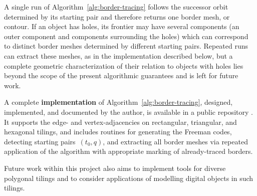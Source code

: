 \begin{remark}
    A single run of Algorithm~\ref{alg:border-tracing} follows the successor orbit determined by its starting pair and therefore returns one border mesh, or contour.
    If an object has holes, its frontier may have several components (an outer component and components surrounding the holes) which can correspond to distinct border meshes determined by different starting pairs.
    Repeated runs can extract these meshes, as in the implementation described below, but a complete geometric characterization of their relation to objects with holes lies beyond the scope of the present algorithmic guarantees and is left for future work.
\end{remark}

A complete \textbf{implementation} of Algorithm~\ref{alg:border-tracing}, designed, implemented, and documented by the author, is available in a public repository \cite{wiederhold2026border_repo}.
It supports the edge- and vertex-adjacencies on rectangular, triangular, and hexagonal tilings, and includes routines for generating the Freeman codes, detecting starting pairs~$(t_0, q)$, and extracting all border meshes via repeated application of the algorithm with appropriate marking of already-traced borders.

Future work within this project also aims to implement tools for diverse polygonal tilings and to consider applications of modelling digital objects in such tilings.
